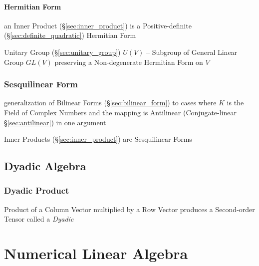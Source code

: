 \paragraph{Hermitian Form}\label{sec:hermitian_form}\hfill

an Inner Product (\S\ref{sec:inner_product}) is a Positive-definite
(\S\ref{sec:definite_quadratic}) Hermitian Form

Unitary Group (\S\ref{sec:unitary_group}) $U(V)$ -- Subgroup of General Linear
Group $GL(V)$ preserving a Non-degenerate Hermitian Form on $V$



\subsubsection{Sesquilinear Form}\label{sec:sesquilinear_form}

generalization of Bilinear Forms (\S\ref{sec:bilinear_form}) to cases where $K$
is the Field of Complex Numbers and the mapping is Antilinear (Conjugate-linear
\S\ref{sec:antilinear}) in one argument

Inner Products (\S\ref{sec:inner_product}) are Sesquilinear Forms



\subsection{Dyadic Algebra}\label{sec:dyadic_algebra}

\subsubsection{Dyadic Product}\label{sec:dyadic_product}

Product of a Column Vector multiplied by a Row Vector produces a Second-order
Tensor called a \emph{Dyadic}



\section{Numerical Linear Algebra}\label{sec:numerical_linear_algebra}

